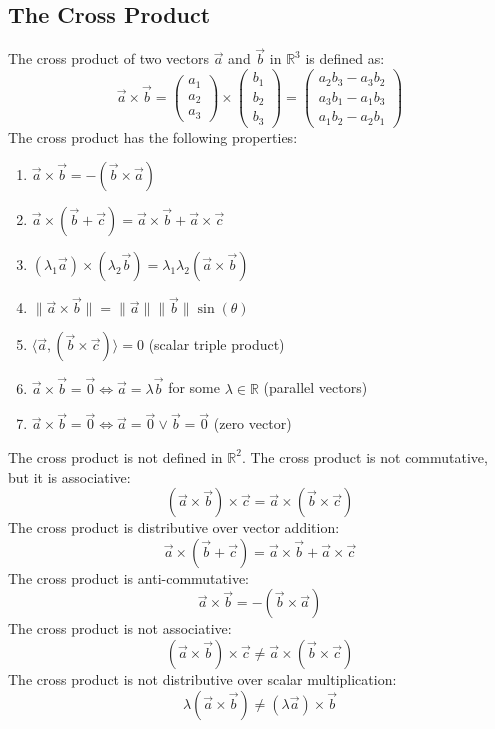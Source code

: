 \subsection{The Cross Product}
The cross product of two vectors $\vec{a}$ and $\vec{b}$ in $\mathbb{R}^3$ is defined as:
\[
	\vec{a} \times \vec{b} = \begin{pmatrix} a_1 \\ a_2 \\ a_3 \end{pmatrix} \times \begin{pmatrix} b_1 \\ b_2 \\ b_3 \end{pmatrix} = \begin{pmatrix} a_2 b_3 - a_3 b_2 \\ a_3 b_1 - a_1 b_3 \\ a_1 b_2 - a_2 b_1 \end{pmatrix}
\]
\noindent The cross product has the following properties:
\begin{enumerate}[label=(\roman*)]
	\item $\vec{a} \times \vec{b} = -(\vec{b} \times \vec{a})$
	\item $\vec{a} \times (\vec{b} + \vec{c}) = \vec{a} \times \vec{b} + \vec{a} \times \vec{c}$
	\item $(\lambda_1\vec{a}) \times (\lambda_2\vec{b}) = \lambda_1\lambda_2(\vec{a} \times \vec{b})$
	\item $\|\vec{a} \times \vec{b}\| = \|\vec{a}\|\|\vec{b}\| \sin(\theta)$
	\item $\langle\vec{a}, (\vec{b} \times \vec{c})\rangle = 0$ (scalar triple product)
	\item $\vec{a} \times \vec{b} = \vec{0} \Leftrightarrow \vec{a} = \lambda\vec{b}$ for some $\lambda \in \mathbb{R}$ (parallel vectors)
	\item $\vec{a} \times \vec{b} = \vec{0} \Leftrightarrow \vec{a} = \vec{0} \vee \vec{b} = \vec{0}$ (zero vector)
\end{enumerate}
\noindent The cross product is not defined in $\mathbb{R}^2$.
\noindent The cross product is not commutative, but it is associative:
\[
	(\vec{a} \times \vec{b}) \times \vec{c} = \vec{a} \times (\vec{b} \times \vec{c})
\]
\noindent The cross product is distributive over vector addition:
\[
	\vec{a} \times (\vec{b} + \vec{c}) = \vec{a} \times \vec{b} + \vec{a} \times \vec{c}
\]
\noindent The cross product is anti-commutative:
\[
	\vec{a} \times \vec{b} = -(\vec{b} \times \vec{a})
\]
\noindent The cross product is not associative:
\[
	(\vec{a} \times \vec{b}) \times \vec{c} \neq \vec{a} \times (\vec{b} \times \vec{c})
\]
\noindent The cross product is not distributive over scalar multiplication:
\[
	\lambda(\vec{a} \times \vec{b}) \neq (\lambda\vec{a}) \times \vec{b}
\]

